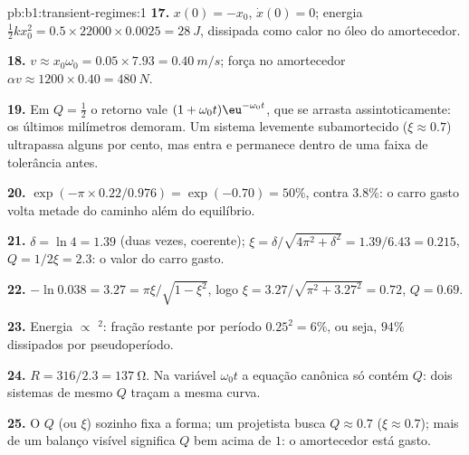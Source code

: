 \begin{solution}{pb:b1:transient-regimes:1}
\textbf{17.} $x(0) = -x_0$, $\dot x(0) = 0$; energia $\tfrac12 kx_0^2 =
0.5 \times 22000 \times 0.0025 = \qty{28}{J}$, dissipada como calor no
óleo do amortecedor.

\textbf{18.} $v \approx x_0\omega_0 = 0.05 \times 7.93 = \qty{0.40}{m/s}$;
força no amortecedor $\alpha v \approx 1200 \times 0.40 = \qty{480}{N}$.

\textbf{19.} Em $Q = \tfrac12$ o retorno vale $(1 + \omega_0 t)\eu^{-\omega_0
t}$, que se arrasta assintoticamente: os últimos milímetros demoram. Um
sistema levemente subamortecido ($\xi \approx 0.7$) ultrapassa alguns
por cento, mas entra e permanece dentro de uma faixa de tolerância antes.

\textbf{20.} $\exp(-\pi \times 0.22/0.976) = \exp(-0.70) = 50\%$, contra
$3.8\%$: o carro gasto volta metade do caminho além do equilíbrio.

\textbf{21.} $\delta = \ln 4 = 1.39$ (duas vezes, coerente); $\xi =
\delta/\sqrt{4\pi^2 + \delta^2} = 1.39/6.43 = 0.215$, $Q = 1/2\xi = 2.3$:
o valor do carro gasto.

\textbf{22.} $-\ln 0.038 = 3.27 = \pi\xi/\sqrt{1 - \xi^2}$, logo $\xi =
3.27/\sqrt{\pi^2 + 3.27^2} = 0.72$, $Q = 0.69$.

\textbf{23.} Energia $\propto$ $^2$: fração restante por
período $0.25^2 = 6\%$, ou seja, $94\%$ dissipados por pseudoperíodo.

\textbf{24.} $R = 316/2.3 = \qty{137}{\ohm}$. Na variável $\omega_0 t$
a equação canônica só contém $Q$: dois sistemas de mesmo $Q$
traçam a mesma curva.

\textbf{25.} O  $Q$ (ou $\xi$) sozinho fixa a forma; um
projetista busca $Q \approx 0.7$ ($\xi \approx 0.7$); mais de um
balanço visível significa $Q$ bem acima de $1$: o amortecedor está gasto.
\end{solution}
